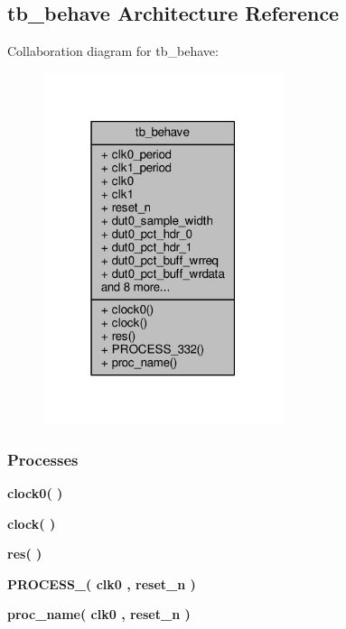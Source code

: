 \subsection{tb\+\_\+behave Architecture Reference}
\label{classdata2packets__top__tb_1_1tb__behave}


Collaboration diagram for tb\+\_\+behave\+:\nopagebreak
\begin{figure}[H]
\begin{center}
\leavevmode
\includegraphics[width=199pt]{da/da6/classdata2packets__top__tb_1_1tb__behave__coll__graph}
\end{center}
\end{figure}
\subsubsection*{Processes}
 \begin{DoxyCompactItemize}
\item 
{\bf clock0}{\bfseries  (  )}
\item 
{\bf clock}{\bfseries  (  )}
\item 
{\bf res}{\bfseries  (  )}
\item 
{\bf P\+R\+O\+C\+E\+S\+S\+\_}{\bfseries  ( {\bfseries {\bfseries {\bf clk0}} \textcolor{vhdlchar}{ }} , {\bfseries {\bfseries {\bf reset\+\_\+n}} \textcolor{vhdlchar}{ }} )}
\item 
{\bf proc\+\_\+name}{\bfseries  ( {\bfseries {\bfseries {\bf clk0}} \textcolor{vhdlchar}{ }} , {\bfseries {\bfseries {\bf reset\+\_\+n}} \textcolor{vhdlchar}{ }} )}
\end{DoxyCompactItemize}
